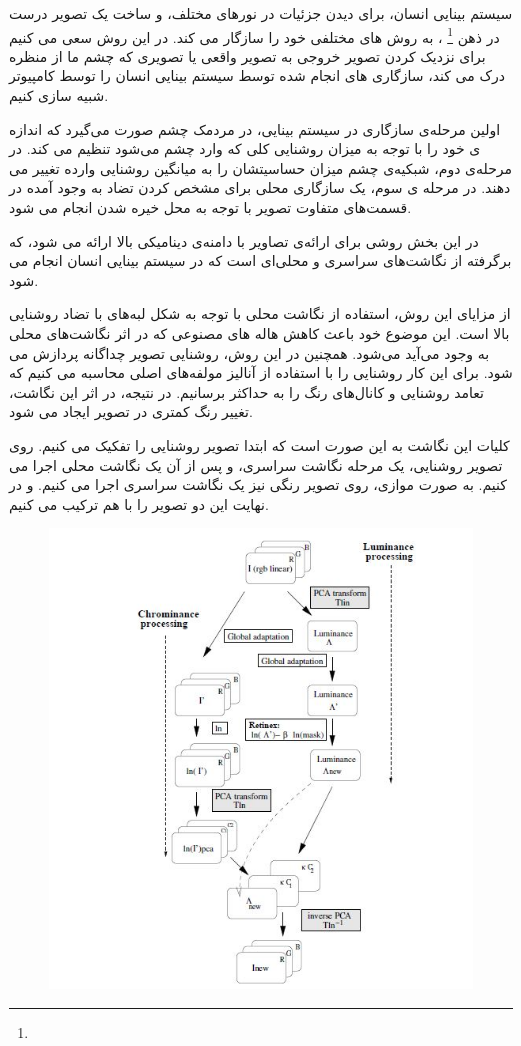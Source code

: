 سیستم بینایی انسان، برای دیدن جزئیات در نورهای مختلف، و ساخت یک تصویر درست در ذهن
\footnote{}
، به روش های مختلفی خود را سازگار می کند.
 در این روش سعی می کنیم برای نزدیک کردن تصویر خروجی به تصویر واقعی یا تصویری که چشم ما از منظره درک می کند، سازگاری های انجام شده توسط سیستم بینایی انسان را توسط کامپیوتر شبیه سازی کنیم. 
 
 اولین مرحله‌ی سازگاری در سیستم بینایی، در مردمک چشم صورت می‌گیرد که اندازه ی خود را با توجه به میزان روشنایی کلی که وارد چشم می‌شود تنظیم می کند. در مرحله‌ی دوم، شبکیه‌ی چشم میزان حساسیتشان را به میانگین روشنایی وارده تغییر می دهند. در مرحله ی سوم، یک سازگاری محلی برای مشخص کردن تضاد به وجود آمده در قسمت‌های متفاوت تصویر با توجه به محل خیره شدن انجام می شود.
 
در این بخش روشی برای ارائه‌ی تصاویر با دامنه‌ی دینامیکی بالا ارائه می شود، که برگرفته از نگاشت‌های سراسری و محلی‌ای است که در سیستم بینایی انسان انجام می شود. 

از مزایای این روش، استفاده از نگاشت محلی با توجه به شکل لبه‌های با تضاد روشنایی بالا است. این موضوع خود باعث کاهش هاله های مصنوعی که در اثر نگاشت‌های محلی به وجود می‌آید می‌شود.
همچنین در این روش،  روشنایی تصویر  چداگانه پردازش می شود. برای این کار روشنایی را با استفاده از آنالیز مولفه‌های اصلی محاسبه می کنیم که تعامد روشنایی و کانال‌های رنگ را به حداکثر برسانیم. در نتیجه، در اثر این نگاشت، تغییر رنگ کمتری در تصویر ایجاد می شود.

کلیات این نگاشت به این صورت است که ابتدا تصویر روشنایی را تفکیک می کنیم. روی تصویر روشنایی، یک مرحله نگاشت سراسری، و پس از آن یک نگاشت محلی اجرا می کنیم. به صورت موازی، روی تصویر رنگی نیز یک نگاشت سراسری اجرا می کنیم. و در نهایت این دو تصویر را با هم ترکیب می کنیم.
\begin{figure}[!htb]
	\includegraphics[width=\linewidth]{images/retinexbigpic}
	\caption{}\label{fig:logtonemap}
	\endminipage\hfill
\end{figure}


